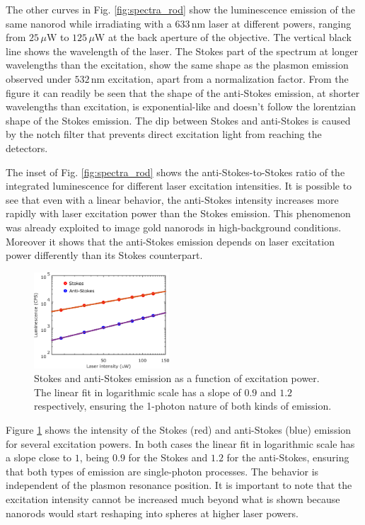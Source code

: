 \documentclass[journal=nalefd,manuscript=letter]{achemso}
\newcommand{\nm}{\ensuremath{\,\textrm{nm}}}
\newcommand{\uW}{\ensuremath{\,\mu\textrm{W}}}
\begin{document}
The other curves in Fig. \ref{fig:spectra_rod} show the luminescence emission of
the same nanorod while irradiating with a $633\nm$ laser at different powers,
ranging from $25\uW$ to $125\uW$ at the back aperture of the objective. The
vertical black line shows the wavelength of the laser. The Stokes part of the
spectrum at longer wavelengths than the excitation, show the same shape as the
plasmon emission observed under $532\nm$ excitation, apart from a normalization
factor. From the figure it can readily be seen that the shape of the anti-Stokes
emission, at shorter wavelengths than excitation, is exponential-like and
doesn't follow the lorentzian shape of the Stokes emission. The dip between
Stokes and anti-Stokes is caused by the notch filter that prevents direct
excitation light from reaching the detectors.

The inset of Fig. \ref{fig:spectra_rod} shows the anti-Stokes-to-Stokes ratio of
the integrated luminescence for different laser excitation intensities. It is
possible to see that even with a linear behavior, the anti-Stokes intensity
increases more rapidly with laser excitation power than the Stokes emission.
This phenomenon was already exploited to image gold nanorods in high-background
conditions. Moreover it shows that the anti-Stokes emission depends on
laser excitation power differently than its Stokes counterpart. 

\begin{figure}[htp] \centering
\includegraphics[width=0.45\textwidth]{Figures/Supplementary/01_AS_S_in_Log/01_AS_S_in_Log.png}
\caption{Stokes and anti-Stokes emission as a function of excitation power. The
linear fit in logarithmic scale has a slope of $0.9$ and $1.2$ respectively,
ensuring the 1-photon nature of both kinds of emission.}
	\label{fig:Log_Plot}
\end{figure}

Figure \ref{fig:Log_Plot} shows the intensity of the Stokes (red) and
anti-Stokes (blue) emission for several excitation powers. In both cases the
linear fit in logarithmic scale has a slope close to $1$, being $0.9$ for the
Stokes and $1.2$ for the anti-Stokes, ensuring that both types of emission are
single-photon processes. The behavior is independent of the plasmon resonance
position. It is important to note that the excitation intensity cannot be
increased much beyond what is shown because nanorods would start reshaping into
spheres at higher laser powers.
\end{document}

